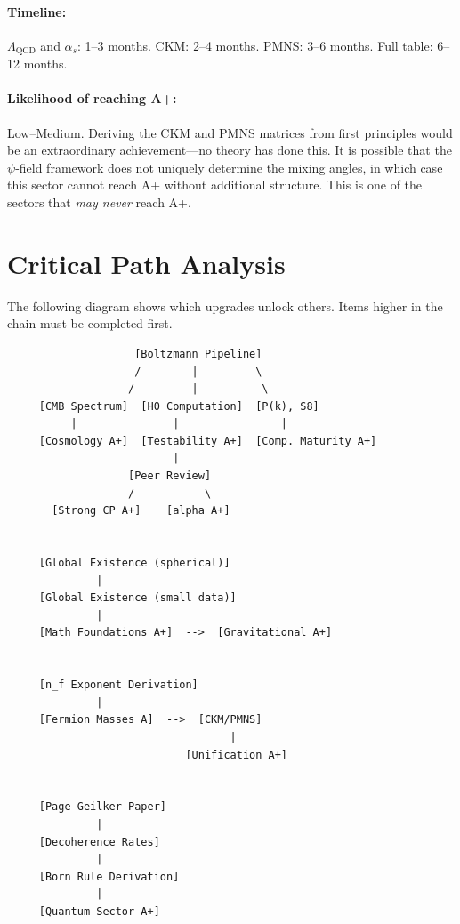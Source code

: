 \documentclass[11pt,a4paper]{article}
\begin{document}
\paragraph{Timeline:} $\Lambda_{\text{QCD}}$ and $\alpha_s$: 1--3 months. CKM: 2--4 months. PMNS: 3--6 months. Full table: 6--12 months.

\paragraph{Likelihood of reaching A+:} \textcolor{hardproblem}{Low--Medium}. Deriving the CKM and PMNS matrices from first principles would be an extraordinary achievement---no theory has done this. It is possible that the $\psi$-field framework does not uniquely determine the mixing angles, in which case this sector cannot reach A+ without additional structure. This is one of the sectors that \emph{may never} reach A+.

\newpage
\section{Critical Path Analysis}

The following diagram shows which upgrades unlock others. Items higher in the chain must be completed first.

\begin{verbatim}
                    [Boltzmann Pipeline]
                    /        |         \
                   /         |          \
     [CMB Spectrum]  [H0 Computation]  [P(k), S8]
          |               |                |
     [Cosmology A+]  [Testability A+]  [Comp. Maturity A+]
                          |
                   [Peer Review]
                   /           \
       [Strong CP A+]    [alpha A+]


     [Global Existence (spherical)]
              |
     [Global Existence (small data)]
              |
     [Math Foundations A+]  -->  [Gravitational A+]


     [n_f Exponent Derivation]
              |
     [Fermion Masses A]  -->  [CKM/PMNS]
                                   |
                            [Unification A+]


     [Page-Geilker Paper]
              |
     [Decoherence Rates]
              |
     [Born Rule Derivation]
              |
     [Quantum Sector A+]
\end{verbatim}
\end{document}
